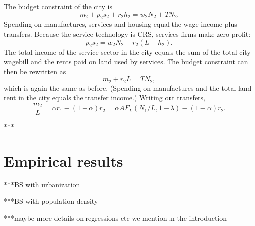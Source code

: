 \documentclass[12pt]{article}
\begin{document}
The budget constraint of the city is
\[
m_2 +p_2s_2+r_2h_2 = w_2N_2+TN_2.
\]
Spending on manufactures, services and housing equal the wage income plus transfers. Because the service technology is CRS, services firms make zero profit:
\[
p_2s_2 = w_2N_2+r_2(L-h_2).
\]
The total income of the service sector in the city equals the sum of the total city wagebill and the rents paid on land used by services. The budget constraint can then be rewritten as
\[
m_2 +r_2L = TN_2,
\]
which is again the same as before. (Spending on manufactures and the total land rent in the city equals the transfer income.) Writing out transfers,
\begin{equation}\label{eq:eq3b}
    \frac{m_2}{L} = \alpha r_1-(1-\alpha)r_2 = \alpha AF_L(N_1/L,1-{\lambda})-(1-\alpha)r_2.
\end{equation}

***



\section{Empirical results}
***BS with urbanization

***BS with population density

***maybe more details on regressions etc we mention in the introduction
\end{document}

